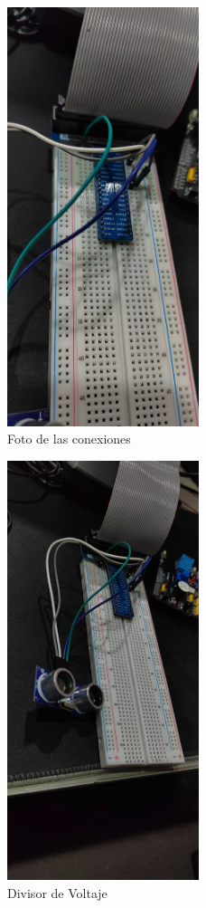 \begin{figure}[h]
	\centering
	\includegraphics[width=0.5\textwidth]{imagenes/foto1}
	\caption{Foto de las conexiones}
\end{figure}

\begin{figure}[h]
	\centering
	\includegraphics[width=0.5\textwidth]{imagenes/foto2}
	\caption{Divisor de Voltaje}
\end{figure}

